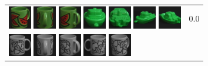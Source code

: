 \begin{figure}[tbp]
\begin{center}
\begin{tabular}{m{11cm} | m{3cm} |}
\includegraphics[width=1cm]{coil/beeld-33.eps} 
\includegraphics[width=1cm]{coil/beeld-35.eps} 
\includegraphics[width=1cm]{coil/beeld-34.eps} 
\includegraphics[width=1cm]{coil/beeld-56.eps} 
\includegraphics[width=1cm]{coil/beeld-59.eps} 
\includegraphics[width=1cm]{coil/beeld-57.eps} 
\includegraphics[width=1cm]{coil/beeld-58.eps} & {\scriptsize 0.0} \\ 
\includegraphics[width=1cm]{coil/beeld-48.eps} 
\includegraphics[width=1cm]{coil/beeld-50.eps} 
\includegraphics[width=1cm]{coil/beeld-49.eps} 
\includegraphics[width=1cm]{coil/beeld-51.eps} 
\includegraphics[width=1cm]{coil/beeld-53.eps} 

\end{tabular}
\end{center}
\end{figure}
